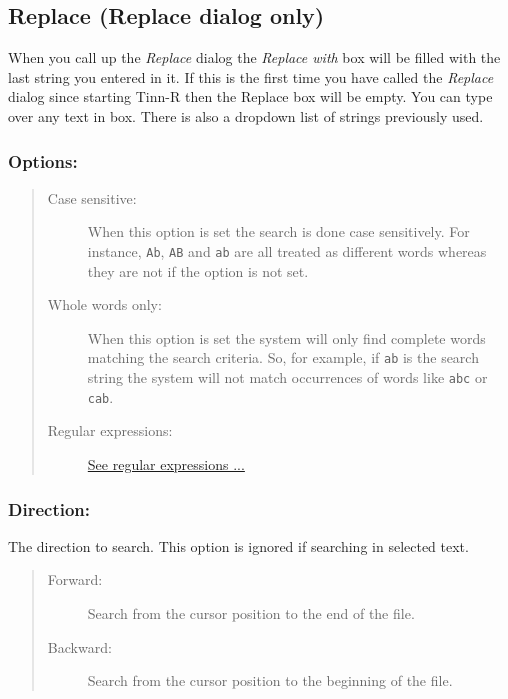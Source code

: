 \subsection{Replace (Replace dialog only)}

When you call up the \textit{Replace} dialog
the \textit{Replace with} box
will be filled with the last string you entered in it. If this is the first
time you have called the \textit{Replace} dialog since starting Tinn-R then
the Replace box will be empty. You can type over any text in box. There is
also a dropdown list of strings previously used.


\subsubsection{Options:}

\begin{quote}
  \begin{footnotesize}
    \begin{description}
      \item[Case sensitive:]
        When this option is set the search is done case sensitively. For instance,
        \texttt{Ab}, \texttt{AB} and \texttt{ab} are all treated as different words
        whereas they are not if the option is not set.
      \item[Whole words only:]
        When this option is set the system will only find complete words matching
        the search criteria. So, for example, if \texttt{ab} is the search string
        the system will not match occurrences of words like \texttt{abc} or
        \texttt{cab}.
      \item[Regular expressions:]
        \href{\#working\_regularexpressions}{See regular expressions ...}
    \end{description}
  \end{footnotesize}
\end{quote}


\subsubsection{Direction:}

The direction to search. This option is ignored if searching in selected text.

\begin{quote}
  \begin{footnotesize}
    \begin{description}
      \item[Forward:]
        Search from the cursor position to the end of the file.
      \item[Backward:]
        Search from the cursor position to the beginning of the file.
    \end{description}
  \end{footnotesize}
\end{quote}


